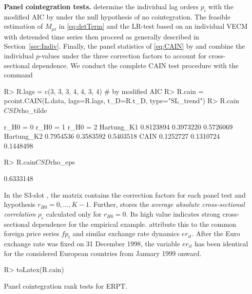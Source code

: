 \textbf{Panel cointegration tests.} \citet{ArsovaOersal2020} determine the individual lag orders $ p_i $ with the modified AIC by \citet{QuPerron2007} under the null hypothesis of no cointegration. The feasible estimation of $ M_{\mu i} $ in \eqref{eq:detTerm} and the LR-test based on an individual VECM with detrended time series then proceed as generally described in Section~\ref{sec:Indiv}. Finally, the panel statistics of \eqref{eq:CAIN} by \citet{Hartung1999} and \citet{ArsovaOersal2020} combine the individual $ p $-values under the three correction factors to account for cross-sectional dependence. We conduct the complete CAIN test procedure with the  command
\begin{CodeChunk}
\begin{CodeInput}
R> R.lags = c(3, 3, 3, 4, 4, 3, 4)  # by modified AIC
R> R.cain = pcoint.CAIN(L.data, lags=R.lags, t_D=R.t_D, type="SL_trend")
R> R.cain$CSD$rho_tilde
\end{CodeInput}
\begin{CodeOutput}
            r_H0 = 0  r_H0 = 1  r_H0 = 2
Hartung_K1 0.8123894 0.3973220 0.5726069
Hartung_K2 0.7954536 0.3583592 0.5403518
CAIN       0.1252727 0.1310724 0.1448498
\end{CodeOutput}
\begin{CodeInput}
R> R.cain$CSD$rho_eps
\end{CodeInput}
\begin{CodeOutput}
[1] 0.6333148
\end{CodeOutput}
\end{CodeChunk}
In the \textsf{S3}-slot , the matrix  contains the correction factors for each panel test and hypothesis $ r_{H0} = 0,\ldots,K-1  $. Further,  stores the \textit{average absolute cross-sectional correlation} $ \rho_\epsilon $ calculated only for $ r_{H0} = 0 $. Its high value indicates strong cross-sectional dependence for the empirical example. \citet[p.~15]{ArsovaOersal2016} attribute this to the common foreign price series $ f\!p_{t} $ and similar exchange rate dynamics $ e\!r_{it} $. After the Euro exchange rate was fixed on 31 December 1998, the variable $ e\!r_{it} $ has been identical for the considered European countries from January 1999 onward.
\begin{CodeChunk}
\begin{CodeInput}
R> toLatex(R.cain)
\end{CodeInput}
\end{CodeChunk}
\begin{table}[ht]	%
	\centering
	\caption[Cointegration rank tests]{Panel cointegration rank tests for ERPT.} 
	\resizebox{0.6\textwidth}{!}{
		}	
	\label{tab:ERPT}
\end{table}
